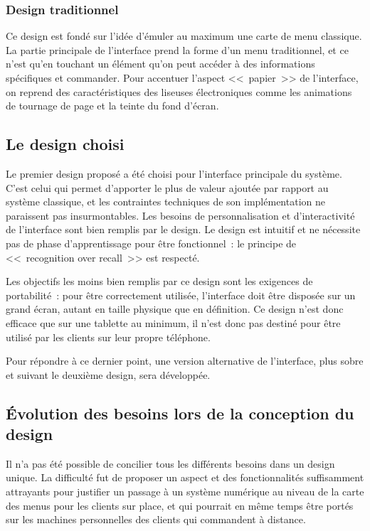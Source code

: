 \documentclass[a4paper,12pt]{article}
\begin{document}
\subsubsection{Design traditionnel}

Ce design est fondé sur l'idée d'émuler au maximum une carte de menu classique. La partie principale de l'interface
prend la forme d'un menu traditionnel, et ce n'est qu'en touchant un élément qu'on peut accéder à des informations
spécifiques et commander. Pour accentuer l'aspect <<~papier~>> de l'interface, on reprend des caractéristiques des
liseuses électroniques comme les animations de tournage de page et la teinte du fond d'écran.

\subsection{Le design choisi}

Le premier design proposé a été choisi pour l'interface principale du système. C'est celui qui permet d'apporter
le plus de valeur ajoutée par rapport au système classique, et les contraintes techniques de son implémentation
ne paraissent pas insurmontables. Les besoins de personnalisation et d'interactivité de l'interface sont bien remplis
par le design. Le design est intuitif et ne nécessite pas de phase d'apprentissage pour être fonctionnel~: le
principe de <<~recognition over recall~>> est respecté.

Les objectifs les moins bien remplis par ce design sont les exigences de portabilité~: pour être correctement utilisée,
l'interface doit être disposée sur un grand écran, autant en taille physique que en définition. Ce design n'est donc
efficace que sur une tablette au minimum, il n'est donc pas destiné pour être utilisé par les clients sur leur propre
téléphone.

Pour répondre à ce dernier point, une version alternative de l'interface, plus sobre et suivant le deuxième design,
sera développée.

\subsection{Évolution des besoins lors de la conception du design}

Il n'a pas été possible de concilier tous les différents besoins dans un design unique. La difficulté fut de proposer
un aspect et des fonctionnalités suffisamment attrayants pour justifier un passage à un système numérique au niveau
de la carte des menus pour les clients sur place, et qui pourrait en même temps être portés sur les machines
personnelles des clients qui commandent à distance.
\end{document}

